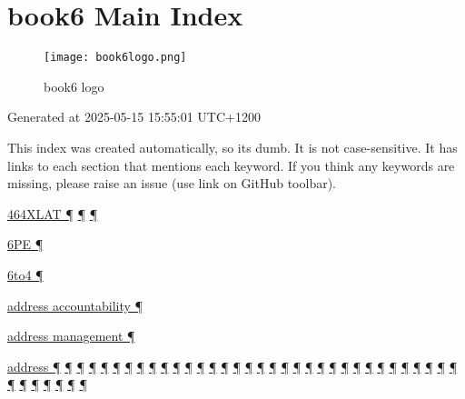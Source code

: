 \documentclass[
]{article}
\begin{document}
\pagebreak

\section{book6 Main Index}\label{book6-main-index}

\begin{figure}
\centering
\texttt{[image: book6logo.png]}
\caption{book6 logo}
\end{figure}

Generated at 2025-05-15 15:55:01 UTC+1200

This index was created automatically, so it\textquotesingle s dumb. It
is not case-sensitive. It has links to each section that mentions each
keyword. If you think any keywords are missing, please raise an issue
(use link on GitHub toolbar).

\hyperref[dual-stack-scenarios]{464XLAT ¶}
\hyperref[translation-and-ipv4-as-a-service]{¶}
\hyperref[deployment-by-carriers]{¶}

\hyperref[tunnels]{6PE ¶}

\hyperref[obsolete-techniques]{6to4 ¶}

\hyperref[address-and-prefix-management]{address accountability ¶}

\hyperref[address-and-prefix-management]{address management ¶}

\hyperref[how-a-user-sees-ipv6]{address ¶}
\hyperref[how-an-application-programmer-sees-ipv6]{¶}
\hyperref[why-version-6]{¶} \hyperref[ipv6-basic-technology]{¶}
\hyperref[address-resolution]{¶} \hyperref[addresses]{¶}
\hyperref[auto-configuration]{¶} \hyperref[dns]{¶}
\hyperref[layer-2-functions]{¶} \hyperref[managed-configuration]{¶}
\hyperref[packet-format]{¶} \hyperref[routing]{¶}
\hyperref[source-and-destination-address-selection]{¶}
\hyperref[coexistence-with-legacy-ipv4]{¶}
\hyperref[dual-stack-scenarios]{¶}
\hyperref[ipv6-primary-differences-from-ipv4]{¶}
\hyperref[obsolete-techniques]{¶}
\hyperref[translation-and-ipv4-as-a-service]{¶} \hyperref[tunnels]{¶}
\hyperref[security]{¶} \hyperref[filtering]{¶}
\hyperref[layer-2-considerations]{¶} \hyperref[topology-obfuscation]{¶}
\hyperref[network-design]{¶} \hyperref[address-planning]{¶}
\hyperref[prefix-per-host]{¶}
\hyperref[address-and-prefix-management]{¶}
\hyperref[basic-windows-commands]{¶} \hyperref[energy-consumption]{¶}
\hyperref[multi-prefix-operation]{¶} \hyperref[multihoming]{¶}
\hyperref[security-operation]{¶} \hyperref[cern-and-the-lhc]{¶}
\hyperref[deployment-by-carriers]{¶}
\hyperref[deployment-in-the-enterprise]{¶}
\hyperref[deployment-in-the-home]{¶} \hyperref[troubleshooting]{¶}
\hyperref[advanced-troubleshooting]{¶} \hyperref[tools]{¶}
\hyperref[obsolete-features-in-ipv6]{¶} \hyperref[markdown-usage]{¶}
\end{document}
